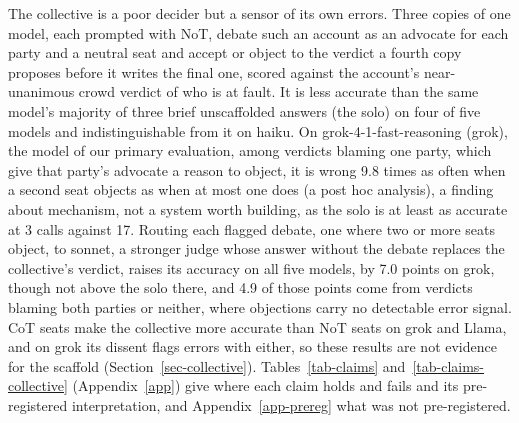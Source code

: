 The collective is a poor decider but a sensor of
its own errors. Three copies
of one model, each prompted with NoT, debate such an account as an advocate for each
party and a neutral seat and accept or object to the verdict a fourth copy
proposes before it writes the final one, scored against the account's
near-unanimous crowd verdict of who is at fault.
It is less accurate
than the same model's majority of three brief unscaffolded answers (the solo) on four
of five models and indistinguishable from it on haiku. On grok-4-1-fast-reasoning (grok),
the model of our primary evaluation, among
verdicts blaming one party, which give that party's advocate a reason to
object, it is wrong 9.8 times as often when a second
seat objects as when at most one does (a post hoc
analysis), a finding about mechanism, not a system worth building, as the solo is at
least as accurate at 3 calls against 17.
Routing each flagged debate, one where two or more seats object, to sonnet,
a stronger judge whose answer without the debate replaces the
collective's verdict, raises its accuracy on all five models,
by 7.0 points on grok, though not above the
solo there, and 4.9 of those points come from verdicts blaming both parties or
neither, where objections carry no detectable error signal.
CoT seats make the collective more accurate than NoT seats on
grok and Llama, and on grok its dissent flags errors with either, so
these results are not evidence for the scaffold (Section~\ref{sec-collective}).
Tables~\ref{tab-claims} and~\ref{tab-claims-collective} (Appendix~\ref{app}) give where each claim holds
and fails and its pre-registered interpretation, and Appendix~\ref{app-prereg} what
was not pre-registered.
